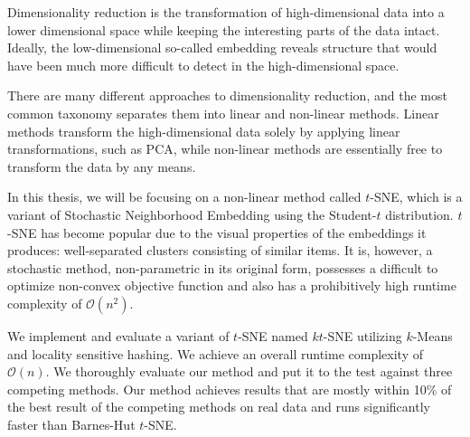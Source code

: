 Dimensionality reduction is the transformation of high-dimensional
data into a lower dimensional space while keeping the interesting parts
of the data intact. Ideally, the low-dimensional so-called embedding
reveals structure that would have been much more difficult to detect
in the high-dimensional space.

There are many different approaches to dimensionality reduction, and the most
common taxonomy separates them into linear and non-linear methods. Linear
methods transform the high-dimensional data solely by applying linear
transformations, such as PCA, while non-linear methods are essentially
free to transform the data by any means.

In this thesis, we will be focusing on a non-linear method called $t$-SNE,
which is a variant of Stochastic Neighborhood Embedding using the Student-$t$
distribution. $t$-SNE has become popular due to the visual properties of the
embeddings it produces: well-separated clusters consisting of similar items.
It is, however, a stochastic method, non-parametric in its original form, possesses
a difficult to optimize non-convex objective function and also has a prohibitively
high runtime complexity of $\mathcal{O}(n^2)$.

We implement and evaluate a variant of $t$-SNE named $kt$-SNE utilizing $k$-Means
and locality sensitive hashing. We achieve an overall runtime complexity of $\mathcal{O}(n)$.
We thoroughly evaluate our method and put it to the test against three competing
methods. Our method achieves results that are mostly within 10\% of the best result of the
competing methods on real data and runs significantly faster than Barnes-Hut $t$-SNE.
